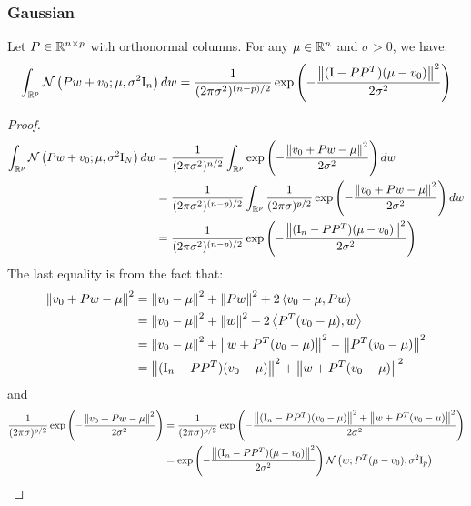 \documentclass[a4paper,10pt]{article}
\begin{document}
\subsubsection*{Gaussian}
\begin{proposition}\label{prop:normal_on_subspace}
    Let $P \in \mathbb{R}^{n \times p}$ with orthonormal columns. For any $\mu \in \mathbb{R}^n$ and $\sigma > 0$, we have:
    \begin{equation*}
        \int_{\mathbb{R}^{p}} \mathcal{N}\left( {P w + v_0; \mu, \sigma^2 \mathrm{I}_{n}} \right) dw = \frac{1}{(2 \pi \sigma^2)^{(n - p) / 2}} \exp \left( -\frac{\left\| (\mathrm{I} - P P^T)(\mu - v_0) \right \|^2}{2\sigma^2} \right)
    \end{equation*}
\end{proposition}
\begin{proof}
    \begin{align*}
        \int_{\mathbb{R}^{p}} \mathcal{N}\left( {P w + v_0; \mu, \sigma^2 \mathrm{I}_N} \right) d w
        &= \frac{1}{(2\pi\sigma^2)^{n/2}} \int_{\mathbb{R}^{p}} \exp \left( -\frac{\left\| v_0 + P w - \mu \right \|^2}{2 \sigma^2} \right) dw \\
        &= \frac{1}{(2\pi \sigma^2)^{(n - p)/2}} \int_{\mathbb{R}^{p}} \frac{1}{(2 \pi \sigma)^{p/2}} \exp \left( -\frac{\left\| v_0 + P w - \mu \right \|^2}{2\sigma^2} \right) dw\\
        &= \frac{1}{(2\pi \sigma^2)^{(n - p)/2}} \exp \left( -\frac{\left\| (\mathrm{I}_n - P P^T)(\mu - v_0) \right \|^2}{2\sigma^2} \right)
    \end{align*}
    The last equality is from the fact that: 
    \begin{align*}
        \left\| v_0 + P w - \mu \right \|^2 &= \left\| v_0 - \mu \right \|^2 + \left\| P w \right \|^2 + 2 \left\langle v_0 - \mu, P w \right\rangle \\ 
        &= \left\| v_0 - \mu \right \|^2 + \left\| w \right \|^2 + 2 \left\langle P^T(v_0 - \mu), w \right\rangle \\
        &= \left\| v_0 - \mu \right \|^2 + \left\| w + P^T(v_0 - \mu) \right \|^2 - \left\| P^T(v_0 - \mu) \right \|^2 \\
        &= \left\| (\mathrm{I}_n - P P^T)(v_0 - \mu) \right \|^2 + \left\| w + P^T(v_0 - \mu) \right \|^2
    \end{align*}
    and 
    \begin{align*}
        \frac{1}{(2 \pi \sigma)^{p/2}} \exp \left( -\frac{\left\| v_0 + P w - \mu \right \|^2}{2\sigma^2} \right) &= \frac{1}{(2 \pi \sigma)^{p/2}} \exp \left( -\frac{ \left\| (\mathrm{I}_n - P P^T)(v_0 - \mu) \right \|^2 + \left\| w + P^T(v_0 - \mu) \right \|^2}{2\sigma^2} \right) \\
        &= \exp \left( -\frac{\left\| (\mathrm{I}_n - P P^T)(\mu - v_0) \right \|^2}{2\sigma^2} \right) \mathcal{N}\left( {w; P^T(\mu - v_0), \sigma^2 \mathrm{I}_p} \right) 
    \end{align*}
\end{proof}
\end{document}
